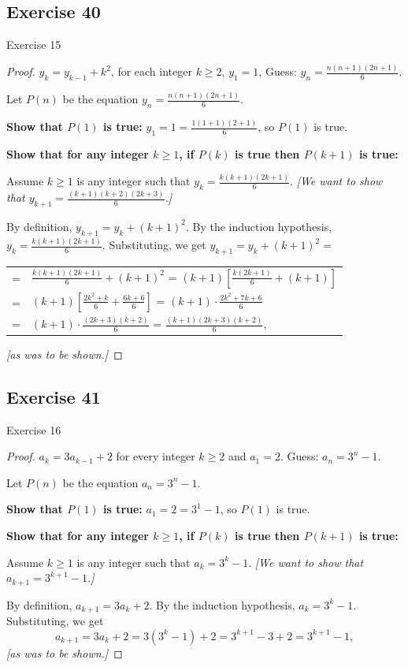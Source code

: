 \documentclass[14pt]{extarticle}
\newcommand{\dps}{\displaystyle}
\begin{document}
\subsection{Exercise 40}
Exercise 15

\begin{proof}
\(y_k = y_{k-1} + k^2\), for each integer \(k \geq 2\),
\(y_1 = 1\), Guess: \(y_n = \dps \frac{n(n+1)(2n+1)}{6}\).

Let $P(n)$ be the equation \(y_n = \dps \frac{n(n+1)(2n+1)}{6}\).

{\bf Show that \(P(1)\) is true:} \(y_1 = 1 = \dps \frac{1(1+1)(2+1)}{6}\), so $P(1)$ is true.

{\bf Show that for any integer \(k \geq 1\), if \(P(k)\) is true then \(P(k+1)\) is true:}

Assume \(k \geq 1\) is any integer such that \(y_k = \dps \frac{k(k+1)(2k+1)}{6}\). 
{\it [We want to show that \(y_{k+1} = \dps \frac{(k+1)(k+2)(2k+3)}{6}\).]}

By definition, \(y_{k+1} = y_k + (k+1)^2\).
By the induction hypothesis, \(y_k = \dps \frac{k(k+1)(2k+1)}{6}\). 
Substituting, we get \(y_{k+1} = y_k + (k+1)^2 =\)

\begin{tabular}{rl}
= & \(\dps \frac{k(k+1)(2k+1)}{6} + (k+1)^2\) 
= \(\dps (k+1)\left[\frac{k(2k+1)}{6} + (k+1)\right]\) \\
= & \(\dps (k+1)\left[\frac{2k^2+k}{6} + \frac{6k+6}{6}\right]\) 
= \(\dps (k+1) \cdot \frac{2k^2+7k+6}{6}\) \\
= & \(\dps (k+1) \cdot \frac{(2k+3)(k+2)}{6}\) 
= \(\dps \frac{(k+1)(2k+3)(k+2)}{6}\),
\end{tabular}

{\it [as was to be shown.]}
\end{proof}

\subsection{Exercise 41}
Exercise 16

\begin{proof}
\(a_k = 3a_{k-1} + 2\) for every integer \(k \geq 2\) and \(a_1 = 2\). Guess: \(a_n = 3^n - 1\).

Let $P(n)$ be the equation \(a_n = 3^n - 1\).

{\bf Show that \(P(1)\) is true:} \(a_1 = 2 = 3^1 - 1\), so $P(1)$ is true.

{\bf Show that for any integer \(k \geq 1\), if \(P(k)\) is true then \(P(k+1)\) is true:}

Assume \(k \geq 1\) is any integer such that \(a_k = 3^k - 1\).
{\it [We want to show that \(a_{k+1} = 3^{k+1} - 1\).]}

By definition, \(a_{k+1} = 3a_k + 2\).
By the induction hypothesis, \(a_k = 3^k - 1\).
Substituting, we get
\[
a_{k+1} = 3a_k + 2 = 3(3^k - 1) + 2 = 3^{k+1} - 3 + 2 = 3^{k+1} - 1,
\]
{\it [as was to be shown.]}
\end{proof}
\end{document}

